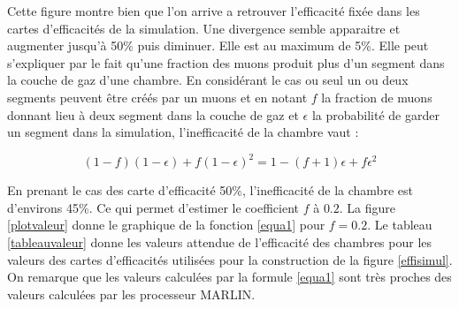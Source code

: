Cette figure montre bien que l'on arrive a retrouver l'efficacité fixée dans les cartes d'efficacités de la simulation. Une divergence semble apparaitre et augmenter jusqu'à 50\% puis diminuer. Elle est au maximum de 5\%. Elle peut s'expliquer par le fait qu'une fraction des muons produit plus d'un segment dans la couche de gaz d'une chambre. En considérant le cas ou seul un ou deux segments peuvent être créés par un muons et en notant $f$ la fraction de muons donnant lieu à deux segment dans la couche de gaz et $\epsilon$ la probabilité de garder un segment dans la simulation, l'inefficacité de la chambre vaut :

\begin{equation}
(1-f)(1-\epsilon)+f(1-\epsilon)^2=1-(f+1)\epsilon+f\epsilon^2 \label{equa1}
\end{equation}

En prenant le cas des carte d'efficacité 50\%, l'inefficacité de la chambre est d'environs 45\%. Ce qui permet d'estimer le coefficient $f$ à $0.2$. La figure \ref{plotvaleur} donne le graphique de la fonction \ref{equa1} pour $f=0.2$. Le tableau \ref{tableauvaleur} donne les valeurs attendue de l'efficacité des chambres pour les valeurs des cartes d'efficacités utilisées pour la construction de la figure \ref{effisimul}. On remarque que les valeurs calculées par la formule \ref{equa1} sont très proches des valeurs calculées par les processeur MARLIN.

